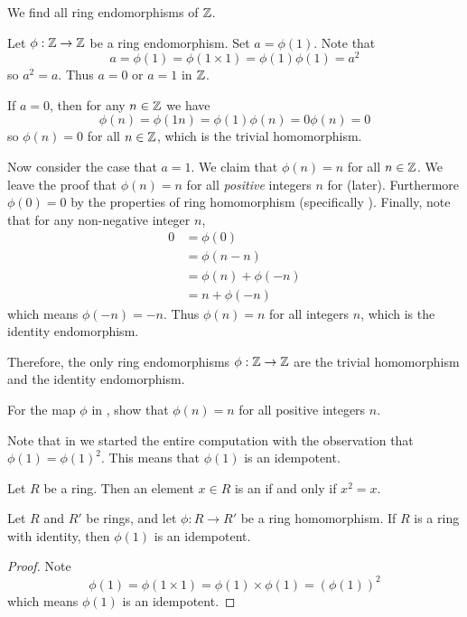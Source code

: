\begin{example}\label{example-endomorphisms-of-Z}
    We find all ring endomorphisms of $\mathbb{Z}$.

    Let $\phi:\mathbb{Z}\to\mathbb{Z}$ be a ring endomorphism. Set $a = \phi(1)$. Note that
    \[
        a = \phi(1) = \phi(1\times1) = \phi(1)\phi(1) = a^2
    \]
    so $a^2 = a$. Thus $a = 0$ or $a = 1$ in $\mathbb{Z}$.

    If $a = 0$, then for any $n \in \mathbb{Z}$ we have
    \[
        \phi(n) = \phi(1n) = \phi(1)\phi(n) = 0\phi(n) = 0
    \]
    so $\phi(n) = 0$ for all $n \in \mathbb{Z}$, which is the trivial homomorphism.

    Now consider the case that $a = 1$. We claim that $\phi(n) = n$ for all $n \in \mathbb{Z}$. We leave the proof that $\phi(n) = n$ for all \textit{positive} integers $n$ for  (later). Furthermore $\phi(0) = 0$ by the properties of ring homomorphism (specifically ). Finally, note that for any non-negative integer $n$,
    \begin{align*}
        0 &= \phi(0)\\
        &= \phi(n - n)\\
        &= \phi(n) + \phi(-n)\\
        &= n + \phi(-n)
    \end{align*}
    which means $\phi(-n) = -n$. Thus $\phi(n) = n$ for all integers $n$, which is the identity endomorphism.

    Therefore, the only ring endomorphisms $\phi:\mathbb{Z}\to\mathbb{Z}$ are the trivial homomorphism and the identity endomorphism.
\end{example}
\begin{exercise}\label{exercise-homomorphism-maps-n-to-n-if-n-is-positive}
    For the map $\phi$ in , show that $\phi(n) = n$ for all positive integers $n$.
\end{exercise}
Note that in  we started the entire computation with the observation that $\phi(1) = \phi(1)^2$. This means that $\phi(1)$ is an idempotent.
\begin{definition}
    Let $R$ be a ring. Then an element $x \in R$ is an  if and only if $x^2 = x$.
\end{definition}
\begin{proposition}\label{prop-homomorphism-on-multiplicative-identity-is-idempotent}
    Let $R$ and $R'$ be rings, and let $\phi: R \to R'$ be a ring homomorphism. If $R$ is a ring with identity, then $\phi(1)$ is an idempotent.
\end{proposition}
\begin{proof}
    Note
    \[
        \phi(1) = \phi(1 \times 1) = \phi(1) \times \phi(1) = \left(\phi(1)\right)^2
    \]
    which means $\phi(1)$ is an idempotent.
\end{proof}

